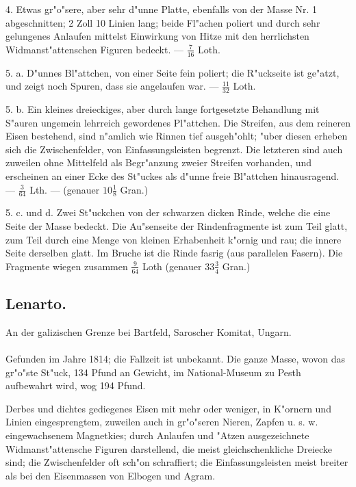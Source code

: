 \documentclass[a4paper, 11pt, oneside, polutonikogreek, german]{article}
\begin{document}
4. Etwas gr"o"sere, aber sehr d"unne Platte, ebenfalls von der Masse Nr. 1 abgeschnitten; 2 Zoll 10 Linien lang; beide Fl"achen poliert und durch sehr gelungenes Anlaufen mittelst Einwirkung von Hitze mit den herrlichsten Widmanst"attenschen Figuren bedeckt. --- $\frac{7}{16}$ Loth.

5. a. D"unnes Bl"attchen, von einer Seite fein poliert; die R"uckseite ist ge"atzt, und zeigt noch Spuren, dass sie angelaufen war. --- $\frac{11}{32}$ Loth.

5. b. Ein kleines dreieckiges, aber durch lange fortgesetzte Behandlung mit S"auren ungemein lehrreich gewordenes Pl"attchen. Die Streifen, aus dem reineren Eisen bestehend, sind n"amlich wie Rinnen tief ausgeh"ohlt; "uber diesen erheben sich die Zwischenfelder, von Einfassungsleisten begrenzt. Die letzteren sind auch zuweilen ohne Mittelfeld als Begr"anzung zweier Streifen vorhanden, und erscheinen an einer Ecke des St"uckes als d"unne freie Bl"attchen hinausragend. --- $\frac{3}{64}$ Lth. --- (genauer $10\frac{1}{8}$ Gran.)

5. c. und d. Zwei St"uckchen von der schwarzen dicken Rinde, welche die eine Seite der Masse bedeckt. Die Au"senseite der Rindenfragmente ist zum Teil glatt, zum Teil durch eine Menge von kleinen Erhabenheit k"ornig und rau; die innere Seite derselben glatt. Im Bruche ist die Rinde fasrig (aus parallelen Fasern). Die Fragmente wiegen zusammen $\frac{9}{64}$ Loth (genauer $33\frac{3}{4}$ Gran.)
\subsection{Lenarto.}
\begin{center}
\small
An der galizischen Grenze bei Bartfeld, Saroscher Komitat, Ungarn.
\end{center}
\paragraph{}
Gefunden im Jahre 1814; die Fallzeit ist unbekannt. Die ganze Masse, wovon das gr"o"ste St"uck, 134 Pfund an Gewicht, im National-Museum zu Pesth aufbewahrt wird, wog 194 Pfund.

Derbes und dichtes gediegenes Eisen mit mehr oder weniger, in K"ornern und Linien eingesprengtem, zuweilen auch in gr"o"seren Nieren, Zapfen u. s. w. eingewachsenem Magnetkies; durch Anlaufen und "Atzen ausgezeichnete Widmanst"attensche Figuren darstellend, die meist gleichschenkliche Dreiecke sind; die Zwischenfelder oft sch"on schraffiert; die Einfassungsleisten meist breiter als bei den Eisenmassen von Elbogen und Agram.
\end{document}
